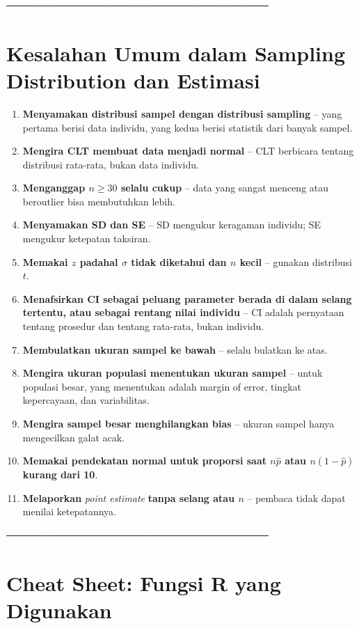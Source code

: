 \documentclass[
  indonesian,
  letterpaper,
]{book}
\begin{document}
──────────────────────────────────────

\section{Kesalahan Umum dalam Sampling Distribution dan
Estimasi}\label{kesalahan-umum-dalam-sampling-distribution-dan-estimasi}

\begin{enumerate}
\def\labelenumi{\arabic{enumi}.}
\item
  \textbf{Menyamakan distribusi sampel dengan distribusi sampling} --
  yang pertama berisi data individu, yang kedua berisi statistik dari
  banyak sampel.
\item
  \textbf{Mengira CLT membuat data menjadi normal} -- CLT berbicara
  tentang distribusi rata-rata, bukan data individu.
\item
  \textbf{Menganggap \(n \geq 30\) selalu cukup} -- data yang sangat
  menceng atau beroutlier bisa membutuhkan lebih.
\item
  \textbf{Menyamakan SD dan SE} -- SD mengukur keragaman individu; SE
  mengukur ketepatan taksiran.
\item
  \textbf{Memakai \(z\) padahal \(\sigma\) tidak diketahui dan \(n\)
  kecil} -- gunakan distribusi \(t\).
\item
  \textbf{Menafsirkan CI sebagai peluang parameter berada di dalam
  selang tertentu, atau sebagai rentang nilai individu} -- CI adalah
  pernyataan tentang prosedur dan tentang rata-rata, bukan individu.
\item
  \textbf{Membulatkan ukuran sampel ke bawah} -- selalu bulatkan ke
  atas.
\item
  \textbf{Mengira ukuran populasi menentukan ukuran sampel} -- untuk
  populasi besar, yang menentukan adalah margin of error, tingkat
  kepercayaan, dan variabilitas.
\item
  \textbf{Mengira sampel besar menghilangkan bias} -- ukuran sampel
  hanya mengecilkan galat acak.
\item
  \textbf{Memakai pendekatan normal untuk proporsi saat \(n\hat{p}\)
  atau \(n(1-\hat{p})\) kurang dari 10}.
\item
  \textbf{Melaporkan} \emph{point estimate} \textbf{tanpa selang atau
  \(n\)} -- pembaca tidak dapat menilai ketepatannya.
\end{enumerate}

──────────────────────────────────────

\section{Cheat Sheet: Fungsi R yang
Digunakan}\label{cheat-sheet-fungsi-r-yang-digunakan}
\end{document}
